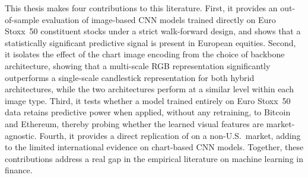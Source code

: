 This thesis makes four contributions to this literature. First, it provides an out-of-sample evaluation of image-based CNN models trained directly on
Euro Stoxx~50 constituent stocks under a strict walk-forward design, and shows that a statistically significant predictive signal is present in European equities. Second, it isolates the effect of the chart image encoding from the choice of backbone architecture, showing that a multi-scale RGB representation significantly outperforms a single-scale candlestick representation for both hybrid architectures, while the two architectures perform at a similar level within each image type. Third, it tests whether a model trained entirely on Euro Stoxx~50 data retains predictive power when applied, without any retraining, to Bitcoin and Ethereum, thereby probing whether the learned visual features are market-agnostic. Fourth, it provides a direct replication of \textcite{Jiang2023} on a non-U.S.\ market, adding to the limited international evidence on chart-based CNN models. Together, these contributions address a real gap in the empirical literature on machine learning in finance.
